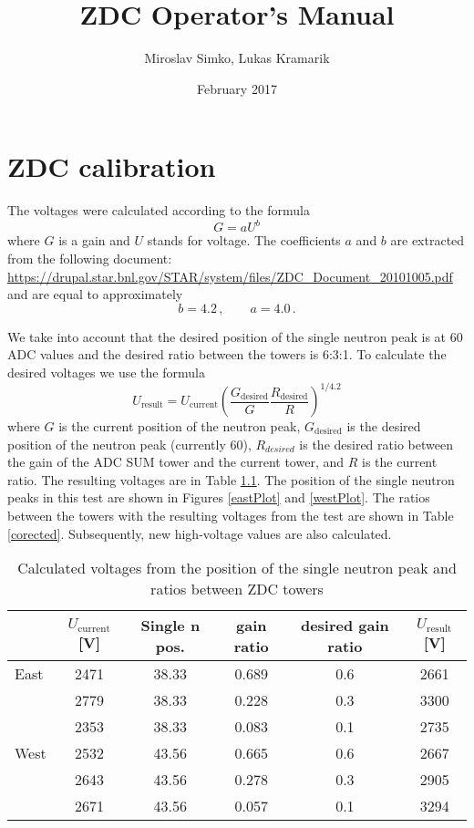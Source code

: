 \documentclass[a4paper,10pt]{report}
\title{ZDC Operator's Manual}
\author{Miroslav Simko, Lukas Kramarik}
\date{February 2017}
\begin{document}
\maketitle

\chapter{ZDC calibration}

The voltages were calculated according to the formula
$$
G = aU^b
$$
where $G$ is a gain and $U$ stands for voltage. The coefficients $a$ and $b$ are 
extracted from the following document:\\
\url{https://drupal.star.bnl.gov/STAR/system/files/ZDC_Document_20101005.pdf}\\
and are equal to approximately
\begin{equation}
b=4.2\,, \qquad a=4.0\,.
\end{equation}

We take into account that the desired position of the single neutron peak is at 60 ADC values
and the desired ratio between the towers is 6:3:1. To calculate the desired voltages we use the
formula
\begin{equation}
U_{\text{result}} = U_\text{current}\left(\frac{G_\text{desired}}{G} 
\frac{R_\text{desired}}{R}\right)^{1/4.2}
\end{equation}
where $G$ is the current position of the neutron peak, $G_\text{desired}$ is the desired position
of the neutron peak (currently 60), $R_{desired}$ is the desired ratio between the gain of the ADC SUM
tower and the current tower, and $R$ is the current ratio.
The resulting voltages are in Table \ref{uncorected}. The position of the single
neutron peaks in this test
are shown in Figures \ref{eastPlot} and \ref{westPlot}.
The ratios between the towers with the resulting voltages from the test
are shown in Table \ref{corected}.
Subsequently, new high-voltage values are also calculated.

\begin{table}[htb] 
\caption{Calculated voltages from the position of the single neutron peak and ratios 
between ZDC towers}
\label{uncorected}
\begin{center}
\begin{tabular}{lccccc}
 \toprule
 &$U_\text{current}$[V]&Single n pos.&gain ratio&desired gain ratio&$U_\text{result}$[V]\\
\midrule
 East&2471&38.33&0.689&0.6&2661\\
     &2779&38.33&0.228&0.3&3300\\
     &2353&38.33&0.083&0.1&2735\\
 \midrule
West&2532&43.56&0.665&0.6&2667\\
    &2643&43.56&0.278&0.3&2905\\
    &2671&43.56&0.057&0.1&3294\\
 \bottomrule
\end{tabular}
\end{center}
\end{table}
\end{document}
